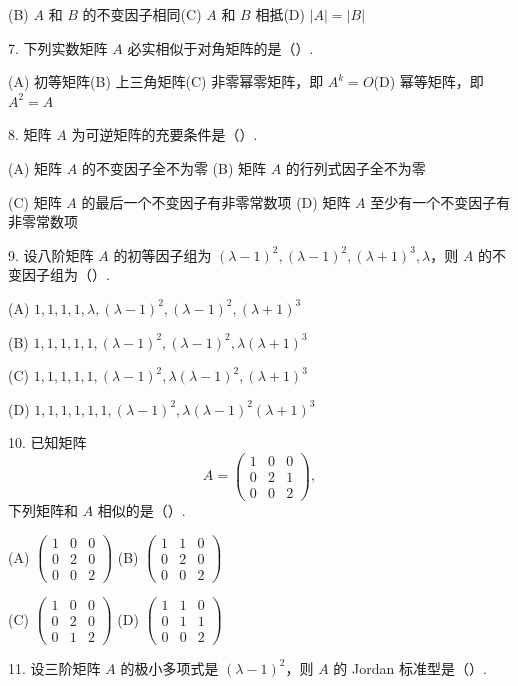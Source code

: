 \documentclass[UTF8,12pt,a4paper,fontset=fandol]{ctexart}
\begin{document}
(B) $A$ 和 $B$ 的不变因子相同\quad (C) $A$ 和 $B$ 相抵\quad (D) $|A|=|B|$

7. 下列实数矩阵 $A$ 必实相似于对角矩阵的是（\quad）.

(A) 初等矩阵\quad (B) 上三角矩阵\quad (C) 非零幂零矩阵，即 $A^k=O$\quad (D) 幂等矩阵，即 $A^2=A$

8. 矩阵 $A$ 为可逆矩阵的充要条件是（\quad）.

(A) 矩阵 $A$ 的不变因子全不为零\quad
(B) 矩阵 $A$ 的行列式因子全不为零

(C) 矩阵 $A$ 的最后一个不变因子有非零常数项\quad
(D) 矩阵 $A$ 至少有一个不变因子有非零常数项

9. 设八阶矩阵 $A$ 的初等因子组为 $(\lambda-1)^2,(\lambda-1)^2,(\lambda+1)^3,\lambda$，则 $A$ 的不变因子组为（\quad）.

(A) $1,1,1,1,\lambda,(\lambda-1)^2,(\lambda-1)^2,(\lambda+1)^3$

(B) $1,1,1,1,1,(\lambda-1)^2,(\lambda-1)^2,\lambda(\lambda+1)^3$

(C) $1,1,1,1,1,(\lambda-1)^2,\lambda(\lambda-1)^2,(\lambda+1)^3$

(D) $1,1,1,1,1,1,(\lambda-1)^2,\lambda(\lambda-1)^2(\lambda+1)^3$

10. 已知矩阵
\[
A=\left(\begin{array}{ccc}1&0&0\\0&2&1\\0&0&2\end{array}\right),
\]
下列矩阵和 $A$ 相似的是（\quad）.

(A) $\left(\begin{array}{ccc}1&0&0\\0&2&0\\0&0&2\end{array}\right)$\quad
(B) $\left(\begin{array}{ccc}1&1&0\\0&2&0\\0&0&2\end{array}\right)$

(C) $\left(\begin{array}{ccc}1&0&0\\0&2&0\\0&1&2\end{array}\right)$\quad
(D) $\left(\begin{array}{ccc}1&1&0\\0&1&1\\0&0&2\end{array}\right)$

11. 设三阶矩阵 $A$ 的极小多项式是 $(\lambda-1)^2$，则 $A$ 的 Jordan 标准型是（\quad）.
\end{document}
